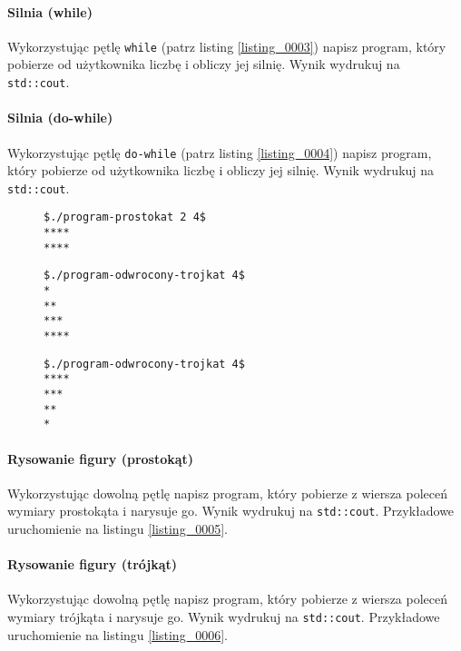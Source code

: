 \documentclass[11pt,a4paper,titlepage,onecolumn]{article}
\begin{document}
\paragraph{Silnia (while)} Wykorzystując pętlę \texttt{while} (patrz listing
\ref{listing_0003}) napisz program, który pobierze od użytkownika liczbę i
obliczy jej silnię. Wynik wydrukuj na \texttt{std::cout}.

\paragraph{Silnia (do-while)} Wykorzystując pętlę \texttt{do-while} (patrz listing
\ref{listing_0004}) napisz program, który pobierze od użytkownika liczbę i
obliczy jej silnię. Wynik wydrukuj na \texttt{std::cout}.

\begin{figure}
\begin{lstlisting}[caption={prostokąt z gwiazdek},
    captionpos=b,
    label=listing_0005]
$./program-prostokat 2 4$
****
****
\end{lstlisting}
\end{figure}

\begin{figure}
\begin{lstlisting}[caption={trójkąt gwiazdek},
    captionpos=b,
    label=listing_0006]
$./program-odwrocony-trojkat 4$
*
**
***
****
\end{lstlisting}
\end{figure}

\begin{figure}
\begin{lstlisting}[caption={odwrócony trójkąt gwiazdek},
    captionpos=b,
    label=listing_0007]
$./program-odwrocony-trojkat 4$
****
***
**
*
\end{lstlisting}
\end{figure}

\paragraph{Rysowanie figury (prostokąt)} Wykorzystując dowolną pętlę napisz
program, który pobierze z wiersza poleceń wymiary prostokąta i narysuje go.
Wynik wydrukuj na \texttt{std::cout}. Przykładowe uruchomienie na listingu
\ref{listing_0005}.

\paragraph{Rysowanie figury (trójkąt)} Wykorzystując dowolną pętlę napisz
program, który pobierze z wiersza poleceń wymiary trójkąta i narysuje go. Wynik
wydrukuj na \texttt{std::cout}. Przykładowe uruchomienie na listingu
\ref{listing_0006}.
\end{document}
